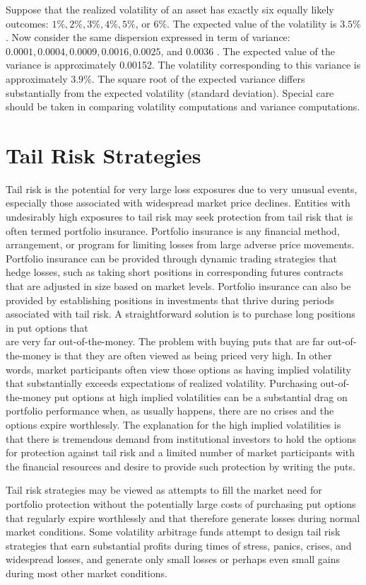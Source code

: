 \documentclass[11pt]{article}
\begin{document}
Suppose that the realized volatility of an asset has exactly six equally likely outcomes: $1 \%, 2 \%, 3 \%, 4 \%, 5 \%$, or $6 \%$. The expected value of the volatility is $3.5 \%$. Now consider the same dispersion expressed in term of variance: $0.0001,0.0004,0.0009,0.0016,0.0025$, and 0.0036 . The expected value of the variance is approximately 0.00152. The volatility corresponding to this variance is approximately $3.9 \%$. The square root of the expected variance differs substantially from the expected volatility (standard deviation). Special care should be taken in comparing volatility computations and variance computations.

\section*{Tail Risk Strategies}
Tail risk is the potential for very large loss exposures due to very unusual events, especially those associated with widespread market price declines. Entities with undesirably high exposures to tail risk may seek protection from tail risk that is often termed portfolio insurance. Portfolio insurance is any financial method, arrangement, or program for limiting losses from large adverse price movements. Portfolio insurance can be provided through dynamic trading strategies that hedge losses, such as taking short positions in corresponding futures contracts that are adjusted in size based on market levels. Portfolio insurance can also be provided by establishing positions in investments that thrive during periods associated with tail risk. A straightforward solution is to purchase long positions in put options that\\
are very far out-of-the-money. The problem with buying puts that are far out-of-the-money is that they are often viewed as being priced very high. In other words, market participants often view those options as having implied volatility that substantially exceeds expectations of realized volatility. Purchasing out-of-the-money put options at high implied volatilities can be a substantial drag on portfolio performance when, as usually happens, there are no crises and the options expire worthlessly. The explanation for the high implied volatilities is that there is tremendous demand from institutional investors to hold the options for protection against tail risk and a limited number of market participants with the financial resources and desire to provide such protection by writing the puts.

Tail risk strategies may be viewed as attempts to fill the market need for portfolio protection without the potentially large costs of purchasing put options that regularly expire worthlessly and that therefore generate losses during normal market conditions. Some volatility arbitrage funds attempt to design tail risk strategies that earn substantial profits during times of stress, panics, crises, and widespread losses, and generate only small losses or perhaps even small gains during most other market conditions.
\end{document}

